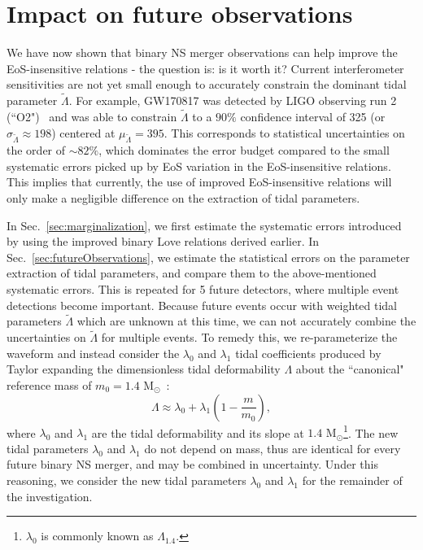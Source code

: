\documentclass[prd,twocolumn,nofootinbib,superscriptaddress,amsmath,amssymb]{revtex4-1}
\begin{document}

\section{Impact on future observations}\label{sec:observations}

We have now shown that binary NS merger observations can help improve the EoS-insensitive relations - the question is: is it worth it?
Current interferometer sensitivities are not yet small enough to accurately constrain the dominant tidal parameter $\tilde{\Lambda}$.
For example, GW170817 was detected by LIGO observing run 2 (``O2")~\cite{aLIGO} and was able to constrain $\tilde{\Lambda}$ to a $90\%$ confidence interval of 325 (or $\sigma_{\tilde{\Lambda}} \approx 198$) centered at $\mu_{\tilde{\Lambda}}=395$.
This corresponds to statistical uncertainties on the order of $\sim 82\%$, which dominates the error budget compared to the small systematic errors picked up by EoS variation in the EoS-insensitive relations.
This implies that currently, the use of improved EoS-insensitive relations will only make a negligible difference on the extraction of tidal parameters.

In Sec.~\ref{sec:marginalization}, we first estimate the systematic errors introduced by using the improved binary Love relations derived earlier.
In Sec.~\ref{sec:futureObservations}, we estimate the statistical errors on the parameter extraction of tidal parameters, and compare them to the above-mentioned systematic errors.
This is repeated for 5 future detectors, where multiple event detections become important.
Because future events occur with weighted tidal parameters $\tilde\Lambda$ which are unknown at this time, we can not accurately combine the uncertainties on $\tilde\Lambda$ for multiple events.
To remedy this, we re-parameterize the waveform and instead consider the $\lambda_0$ and $\lambda_1$ tidal coefficients produced by Taylor expanding the dimensionless tidal deformability $\Lambda$ about the ``canonical" reference mass of $m_0=1.4\text{ M}_{\odot}$~\cite{delPozzo:TaylorTidal,Yagi:binLove}:
\begin{equation}
\Lambda \approx \lambda_0 + \lambda_1 (1-\frac{m}{m_0}),
\end{equation}
where $\lambda_0$ and $\lambda_1$ are the tidal deformability and its slope at $1.4 \text{ M}_{\odot}$\footnote{$\lambda_0$ is commonly known as $\Lambda_{1.4}$.}. 
The new tidal parameters $\lambda_0$ and $\lambda_1$ do not depend on mass, thus are identical for every future binary NS merger, and may be combined in uncertainty.
Under this reasoning, we consider the new tidal parameters $\lambda_0$ and $\lambda_1$ for the remainder of the investigation.
\end{document}
